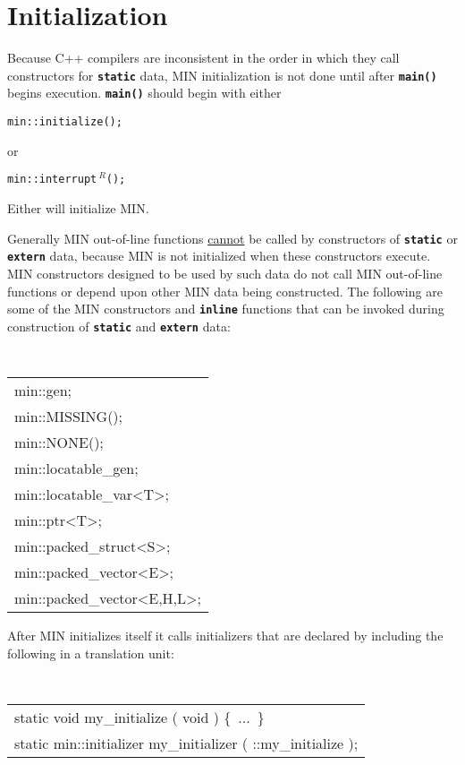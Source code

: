 \documentclass[12pt]{article}
\newcommand{\TT}[1]{{\tt \bfseries #1}}
\newcommand{\REL}{$\,^R$}
\begin{document}
\section{Initialization}

Because C++ compilers are inconsistent in the order in which they
call constructors for \TT{static} data, MIN initialization is
not done until after \TT{main()} begins execution.  \TT{main()}
should begin with either
\begin{center}
\tt min::initialize();
\end{center}
or
\begin{center}
\tt min::interrupt\REL();
\end{center}

Either will initialize MIN.

Generally MIN out-of-line functions \underline{cannot} be called
by constructors of \TT{static} or \TT{extern} data, because
MIN is not initialized when these constructors execute.
MIN constructors designed to be used by such data do not call
MIN out-of-line functions or depend upon other MIN data being
constructed.  The following are some of the MIN constructors
and \TT{inline} functions that can be invoked during construction
of \TT{static} and \TT{extern} data:
\begin{center}
\tt
\begin{tabular}{l}
min::gen; \\
min::MISSING(); \\
min::NONE(); \\
min::locatable\_gen; \\
min::locatable\_var<T>; \\
min::ptr<T>; \\
min::packed\_struct<S>; \\
min::packed\_vector<E>; \\
min::packed\_vector<E,H,L>; \\
\end{tabular}
\end{center}

After MIN initializes itself it calls initializers that are
declared by including the following in a translation unit:

\begin{center}
\tt
\begin{tabular}{l}
static void my\_initialize ( void ) \{~...~\} \\
static min::initializer my\_initializer ( ::my\_initialize ); \\
\end{tabular}
\end{center}
\end{document}
